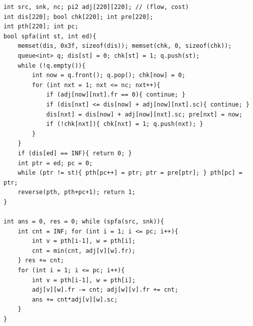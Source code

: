 \begin{verbatim}
int src, snk, nc; pi2 adj[220][220]; // (flow, cost)
int dis[220]; bool chk[220]; int pre[220];
int pth[220]; int pc;
bool spfa(int st, int ed){
	memset(dis, 0x3f, sizeof(dis)); memset(chk, 0, sizeof(chk));
	queue<int> q; dis[st] = 0; chk[st] = 1; q.push(st);
	while (!q.empty()){
		int now = q.front(); q.pop(); chk[now] = 0;
		for (int nxt = 1; nxt <= nc; nxt++){
			if (adj[now][nxt].fr == 0){ continue; }
			if (dis[nxt] <= dis[now] + adj[now][nxt].sc){ continue; }
			dis[nxt] = dis[now] + adj[now][nxt].sc; pre[nxt] = now;
			if (!chk[nxt]){ chk[nxt] = 1; q.push(nxt); }
		}
	}
	if (dis[ed] == INF){ return 0; }
	int ptr = ed; pc = 0;
	while (ptr != st){ pth[pc++] = ptr; ptr = pre[ptr]; } pth[pc] = ptr;
	reverse(pth, pth+pc+1); return 1;
}

int ans = 0, res = 0; while (spfa(src, snk)){
	int cnt = INF; for (int i = 1; i <= pc; i++){
		int v = pth[i-1], w = pth[i];
		cnt = min(cnt, adj[v][w].fr);
	} res += cnt;
	for (int i = 1; i <= pc; i++){
		int v = pth[i-1], w = pth[i];
		adj[v][w].fr -= cnt; adj[w][v].fr += cnt;
		ans += cnt*adj[v][w].sc;
	}
}
\end{verbatim}